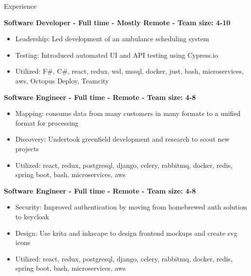 \documentclass{resume} %
\begin{document}
\begin{rSection}{Experience}

\textbf{Software Developer - Full time - Mostly Remote - Team size: 4-10} \\

\begin{itemize}
  \itemsep -2pt {}
      \item Leadership: Led development of an ambulance scheduling system
    \item Testing: Introduced automated UI and API testing using Cypress.io
    \item Utilized: F\#, C\#, react, redux, wsl, mssql, docker, just, bash, microservices, aws, Octopus Deploy, Teamcity
\end{itemize}

\textbf{Software Engineer - Full time - Remote - Team size: 4-8} \\

\begin{itemize}
  \itemsep -2pt {}
      \item Mapping: consume data from many customers in many formats to a unified format for processing
    \item Discovery: Undertook greenfield development and research to scout new projects
    \item Utilized: react, redux, postgresql, django, celery, rabbitmq, docker, redis, spring boot, bash, microservices, aws
\end{itemize}

\textbf{Software Engineer - Full time - Remote - Team size: 4-8} \\

\begin{itemize}
  \itemsep -2pt {}
      \item Security: Improved authentication by moving from homebrewed auth solution to keycloak
    \item Design: Use krita and inkscape to design frontend mockups and create svg icons
    \item Utilized: react, redux, postgresql, django, celery, rabbitmq, docker, redis, spring boot, bash, microservices, aws
\end{itemize}


\end{rSection}
\end{document}

